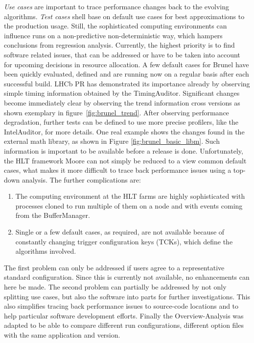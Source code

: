 \documentclass[a4paper]{jpconf}
\begin{document}
\textit{Use cases} are important to trace performance changes back to the evolving algorithms. \textit{Test cases} shell base on default use cases for best approximations to the production usage. Still, the sophisticated computing environments can influence runs on a non-predictive non-deterministic way, which hampers conclusions from regression analysis. Currently, the highest priority is to find software related issues, that can be addressed or have to be taken into account for upcoming decisions in resource allocation.
\newline
A few default cases for Brunel have been quickly evaluated, defined and are running now on a regular basis after each successful build. LHCb PR has demonstrated its importance already by observing simple timing information obtained by the TimingAuditor. Significant changes become immediately clear by observing the trend information cross versions as shown exemplary in \mbox{figure \ref{fig:brunel_trend}}. After observing performance degradation, further tests can be defined to use more precise profilers, like the IntelAuditor, for more details. One real example shows the changes found in the external math library, as shown in Figure \ref{fig:brunel_basic_libm}. Such information is important to be available before a release is done. %
\newline
Unfortunately, the HLT framework Moore can not simply be reduced to a view common default cases, what makes it more difficult to trace back performance issues using a top-down analysis. The further complications are:
\begin{enumerate}
 \item The computing environment at the HLT farms are highly sophisticated with processes cloned to run multiple of them on a node and with events coming from the BufferManager.
 \item Single or a few default cases, as required, are not available because of constantly changing trigger configuration keys (TCKs), which define the algorithms involved.
\end{enumerate}
The first problem can only be addressed if users agree to a representative standard configuration. Since this is currently not available, no enhancements can here be made. The second problem can partially be addressed by not only splitting use cases, but also the software into parts for further investigations. This also simplifies tracing back performance issues to source-code locations and to help particular software development efforts. Finally the Overview-Analysis was adapted to be able to compare different run configurations, different option files with the same application and version.
\end{document}

